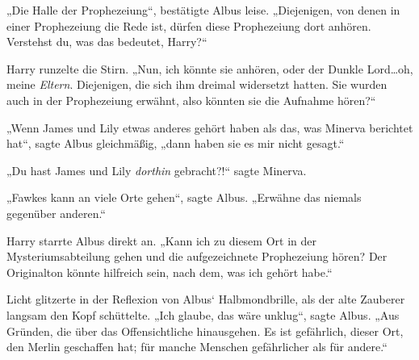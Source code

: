 „Die Halle der Prophezeiung“, bestätigte Albus leise. „Diejenigen, von denen in einer Prophezeiung die Rede ist, dürfen diese Prophezeiung dort anhören. Verstehst du, was das bedeutet, Harry?“

Harry runzelte die Stirn. „Nun, ich könnte sie anhören, oder der Dunkle Lord…oh, meine \emph{Eltern}. Diejenigen, die sich ihm dreimal widersetzt hatten. Sie wurden auch in der Prophezeiung erwähnt, also könnten sie die Aufnahme hören?“

„Wenn James und Lily etwas anderes gehört haben als das, was Minerva berichtet hat“, sagte Albus gleichmäßig, „dann haben sie es mir nicht gesagt.“

„Du hast James und Lily \emph{dorthin} gebracht?!“ sagte Minerva.

„Fawkes kann an viele Orte gehen“, sagte Albus. „Erwähne das niemals gegenüber anderen.“

Harry starrte Albus direkt an. „Kann ich zu diesem Ort in der Mysteriumsabteilung gehen und die aufgezeichnete Prophezeiung hören? Der Originalton könnte hilfreich sein, nach dem, was ich gehört habe.“

Licht glitzerte in der Reflexion von Albus‘ Halbmondbrille, als der alte Zauberer langsam den Kopf schüttelte. „Ich glaube, das wäre unklug“, sagte Albus. „Aus Gründen, die über das Offensichtliche hinausgehen. Es ist gefährlich, dieser Ort, den Merlin geschaffen hat; für manche Menschen gefährlicher als für andere.“

